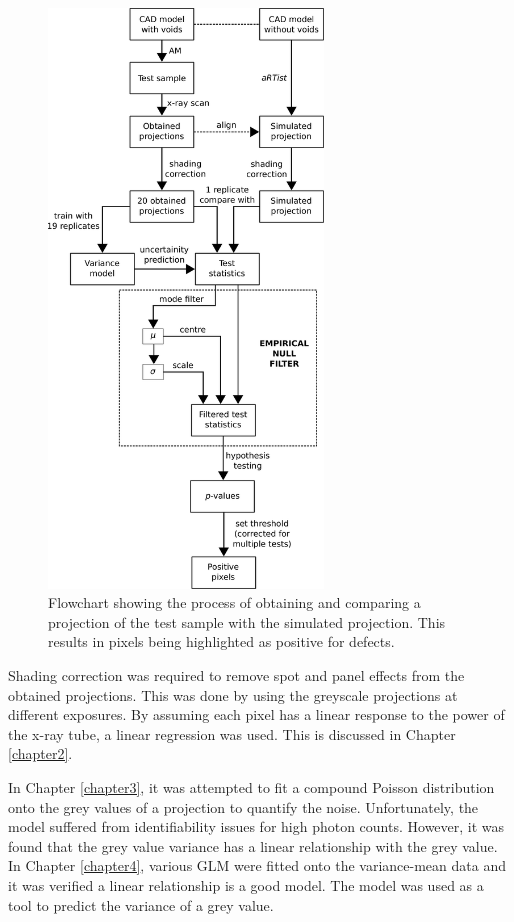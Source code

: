 \documentclass[12pt, a4paper, oneside]{memoir}
\begin{document}
\begin{figure}
  \centering
  \includegraphics[width=0.65\textwidth]{../figures/flowchart.pdf}
  \caption{Flowchart showing the process of obtaining and comparing a projection of the test sample with the simulated projection. This results in pixels being highlighted as positive for defects.}
  \label{fig:evaluation_flowchart}
\end{figure}

Shading correction was required to remove spot and panel effects from the obtained projections. This was done by using the greyscale projections at different exposures. By assuming each pixel has a linear response to the power of the x-ray tube, a linear regression was used. This is discussed in Chapter \ref{chapter2}.

In Chapter \ref{chapter3}, it was attempted to fit a compound Poisson distribution onto the grey values of a projection to quantify the noise. Unfortunately, the model suffered from identifiability issues for high photon counts. However, it was found that the grey value variance has a linear relationship with the grey value. In Chapter \ref{chapter4}, various GLM were fitted onto the variance-mean data and it was verified a linear relationship is a good model. The model was used as a tool to predict the variance of a grey value.
\end{document}
